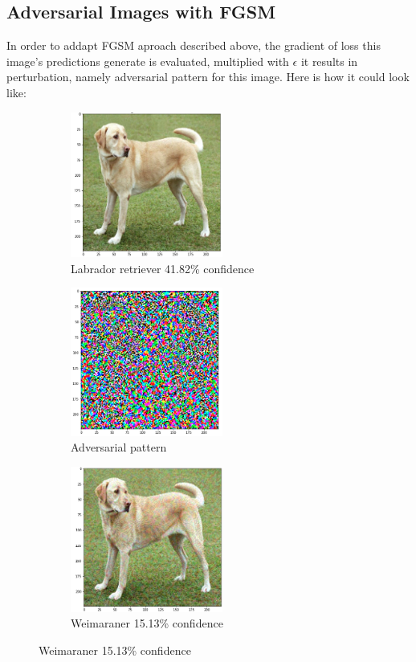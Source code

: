 \documentclass[12pt]{extarticle}
\begin{document}
\newpage
\subsection{Adversarial Images with FGSM}
In order to addapt FGSM aproach described above, the gradient of loss this image's predictions generate is evaluated, multiplied with $\epsilon$ it results in perturbation, namely adversarial pattern for this image. Here is how it could look like: 
\begin{figure}[!h]
  \begin{subfigure}{0.33\textwidth}
    \caption{Labrador retriever 41.82\% confidence}
    \includegraphics[width=5cm]{images/labrador.png}
  \end{subfigure}
  \begin{subfigure}{0.33\textwidth}
    \caption{Adversarial pattern}
    \includegraphics[width=5cm]{images/adv_pattern.png}
  \end{subfigure}
  \begin{subfigure}{0.3\textwidth}
    \caption{Weimaraner 15.13\% confidence}
    \includegraphics[width=5cm]{images/adv_labrador.png}
  \end{subfigure}
\end{figure}
\end{document}
